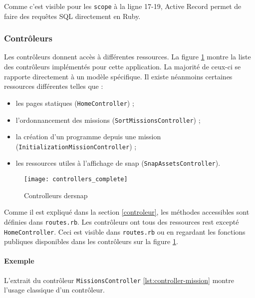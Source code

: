 Comme c'est visible pour les \lstinline[language=Rails]{scope} à la ligne 17-19, Active Record permet de faire des requêtes SQL directement en Ruby. 
\begin{figure}

\end{figure}

\subsubsection{Contrôleurs}
Les contrôleurs donnent accès à différentes ressources. La figure \ref{fig:controllers} montre la liste des contrôleurs implémentés pour cette application. La majorité de ceux-ci se rapporte directement à un modèle spécifique. Il existe néanmoins certaines ressources différentes telles que : 
\begin{itemize}
  \item les pages statiques (\texttt{HomeController}) ;
  \item l'ordonnancement des \glspl{mission} (\texttt{SortMissionsController}) ; 
  \item la création d'un programme depuis une \gls{mission} (\texttt{InitializationMissionController}) ;
  \item les ressources utiles à l'affichage de \gls{snap} (\texttt{SnapAssetsController}).
\end{itemize}

\begin{figure}
 \begin{center}
   \texttt{[image: controllers\_complete]}
   \caption{Controlleurs de\gls{rsnap}}
   \label{fig:controllers}
 \end{center}
\end{figure}

Comme il est expliqué dans la section \ref{controleur}, les méthodes accessibles sont définies dans \texttt{routes.rb}. Les contrôleurs ont tous des ressources \gls{rest} excepté \texttt{HomeController}. Ceci est visible dans \texttt{routes.rb} ou en regardant les fonctions publiques disponibles dans les contrôleurs sur la figure \ref{fig:controllers}.

\paragraph{Exemple}
L'extrait du contrôleur \texttt{MissionsController} \ref{lst:controller-mission} montre l'usage classique d'un contrôleur. 

